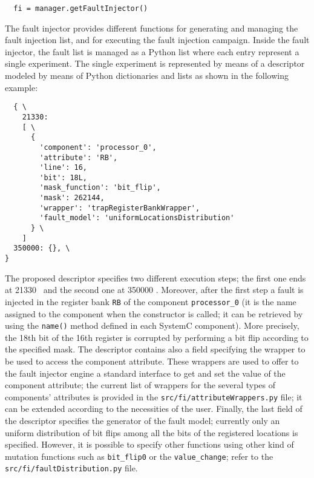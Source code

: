 \scriptsize
\begin{verbatim}
  fi = manager.getFaultInjector()
\end{verbatim}
\normalsize

\indent The fault injector provides different functions for generating and managing the fault injection list, and for executing the fault injection campaign. Inside the fault injector, the fault list is managed as a Python list where each entry represent a single experiment. The single experiment is represented by means of a descriptor modeled by means of Python dictionaries and lists as shown in the following example:

\scriptsize
\begin{verbatim}
  { \
    21330: 
    [ \
      {
        'component': 'processor_0', 
        'attribute': 'RB', 
        'line': 16, 
        'bit': 18L,
        'mask_function': 'bit_flip', 
        'mask': 262144, 
        'wrapper': 'trapRegisterBankWrapper',
        'fault_model': 'uniformLocationsDistribution' 
      } \
    ]
  350000: {}, \
}
\end{verbatim}
\normalsize

\indent The proposed descriptor specifies two different execution steps; the first one ends at 21330 \nano\second~and the second one at 350000 \nano\second. Moreover, after the first step a fault is injected in the register bank \texttt{RB} of the component \texttt{processor\_0} (it is the name assigned to the component when the constructor is called; it can be retrieved by using the \texttt{name()} method defined in each SystemC component). More precisely, the 18th bit of the 16th register is corrupted by performing a bit flip according to the specified mask. The descriptor contains also a field specifying the wrapper to be used to access the component attribute. These wrappers are used to offer to the fault injector engine a standard interface to get and set the value of the component attribute; the current list of wrappers for the several types of components' attributes is provided in the \texttt{src/fi/attributeWrappers.py} file; it can be extended according to the necessities of the user. Finally, the last field of the descriptor specifies the generator of the fault model; currently only an uniform distribution of bit flips among all the bits of the registered locations is specified. However, it is possible to specify other functions using other kind of mutation functions such as \texttt{bit\_flip0} or the \texttt{value\_change}; refer to the \texttt{src/fi/faultDistribution.py} file.

